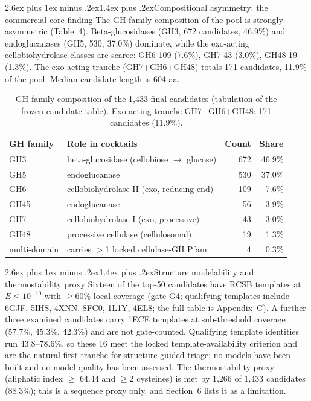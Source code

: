 \documentclass[11pt]{article}
\makeatletter
\renewcommand{\subsection}{\@startsection{subsection}{2}{\z@}%
  {2.6ex plus 1ex minus .2ex}{1.4ex plus .2ex}{\large\bfseries\color{navy}}}
\makeatother
\begin{document}
\subsection{Compositional asymmetry: the commercial core finding}
The GH-family composition of the pool is strongly asymmetric (Table~4). Beta-glucosidases (GH3, 672 candidates, 46.9\%) and endoglucanases (GH5, 530, 37.0\%) dominate, while the exo-acting cellobiohydrolase classes are scarce: GH6 109 (7.6\%), GH7 43 (3.0\%), GH48 19 (1.3\%). The exo-acting tranche (GH7+GH6+GH48) totals 171 candidates, 11.9\% of the pool. Median candidate length is 604 aa.

\begin{table}[h]
\centering\small
{}
\begin{tabular}{|l|l|r|r|}
\hline
\rowcolor{lightnavy}\textbf{GH family} & \textbf{Role in cocktails} & \textbf{Count} & \textbf{Share} \\\hline
GH3 & beta-glucosidase (cellobiose $\to$ glucose) & 672 & 46.9\% \\\hline
GH5 & endoglucanase & 530 & 37.0\% \\\hline
GH6 & cellobiohydrolase II (exo, reducing end) & 109 & 7.6\% \\\hline
GH45 & endoglucanase & 56 & 3.9\% \\\hline
GH7 & cellobiohydrolase I (exo, processive) & 43 & 3.0\% \\\hline
GH48 & processive cellulase (cellulosomal) & 19 & 1.3\% \\\hline
multi-domain & carries $>$1 locked cellulase-GH Pfam & 4 & 0.3\% \\\hline
\end{tabular}
\caption{GH-family composition of the 1,433 final candidates (tabulation of the frozen candidate table). Exo-acting tranche GH7+GH6+GH48: 171 candidates (11.9\%).}
\end{table}

\subsection{Structure modelability and thermostability proxy}
Sixteen of the top-50 candidates have RCSB templates at $E \le 10^{-10}$ with $\ge$60\% local coverage (gate G4; qualifying templates include 6GJF, 5IHS, 4XNN, 8FC0, 1L1Y, 4EL8; the full table is Appendix~C). A further three examined candidates carry 1ECE templates at sub-threshold coverage (57.7\%, 45.3\%, 42.3\%) and are not gate-counted. Qualifying template identities run 43.8--78.6\%, so these 16 meet the locked template-availability criterion and are the natural first tranche for structure-guided triage; no models have been built and no model quality has been assessed. The thermostability proxy (aliphatic index $\ge$ 64.44 and $\ge$2 cysteines) is met by 1,266 of 1,433 candidates (88.3\%); this is a sequence proxy only, and Section~6 lists it as a limitation.
\end{document}

